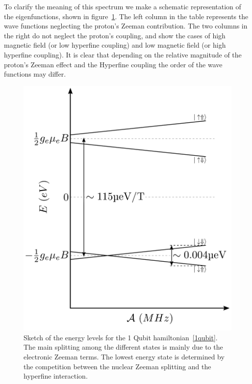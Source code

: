 To clarify the meaning of this spectrum we make a schematic representation of the eigenfunctions, shown in figure~\ref{levels1Qbit}. The left column in the table represents the wave functions neglecting the proton's Zeeman contribution. The two columns in the right do not neglect the proton's coupling, and show the cases of high magnetic field (or low hyperfine coupling) and low magnetic field (or high hyperfine coupling). It is clear that depending on the relative magnitude of the proton's Zeeman effect and the Hyperfine coupling the order of the wave functions may differ.
\begin{figure}[h!]
\centering
\includegraphics{chapter03/figures/levels1Qbit.pdf} %
\vspace{-5pt}
\caption{Sketch of the energy levels for the 1 Qubit hamiltonian~\eqref{1qubit}. The main splitting among the different states is mainly due to the electronic Zeeman terms. The lowest energy state is determined by the competition between the nuclear Zeeman splitting and the hyperfine interaction.}
\label{levels1Qbit}
\end{figure}
